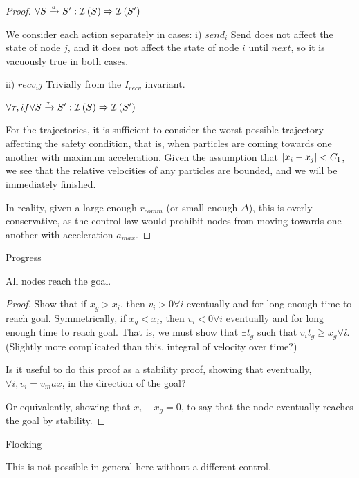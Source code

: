\documentclass[10pt, conference, compsocconf]{IEEEtran}
\begin{document}
\begin{proof}
$\forall S \xrightarrow{a} S^{\prime} : {\cal I}\left(S\right) \Rightarrow {\cal I}\left(S^{\prime}\right)$

We consider each action separately in cases:
i) $send_i$
Send does not affect the state of node $j$, and it does not affect the state of node $i$ until $next$, so it is vacuously true in both cases.

ii) $recv_ij$
Trivially from the $I_{recv}$ invariant.

$\forall \tau, if \forall S \xrightarrow{\tau} S^{\prime} : {\cal I}\left(S\right) \Rightarrow {\cal I}\left(S^{\prime}\right)$

For the trajectories, it is sufficient to consider the worst possible trajectory affecting the safety condition, that is, when particles are coming towards one another with maximum acceleration.  Given the assumption that $\lvert x_i - x_j\rvert < C_1$, we see that the relative velocities of any particles are bounded, and we will be immediately finished.

In reality, given a large enough $r_{comm}$ (or small enough $\Delta$), this is overly conservative, as the control law would prohibit nodes from moving towards one another with acceleration $a_{max}$.
\end{proof}

\begin{inv}Progress

All nodes reach the goal.
\end{inv}

\begin{proof}
Show that if $x_g > x_i$, then $v_i > 0 \forall i$ eventually and for long enough time to reach goal.  Symmetrically, if $x_g < x_i$, then $v_i < 0 \forall i$ eventually and for long enough time to reach goal.  That is, we must show that $\exists t_g$ such that $v_i t_g \geq x_g \forall i$.  (Slightly more complicated than this, integral of velocity over time?)

Is it useful to do this proof as a stability proof, showing that eventually, $\forall i, v_i = v_max$, in the direction of the goal?

Or equivalently, showing that $x_i - x_g = 0$, to say that the node eventually reaches the goal by stability.
\end{proof}

\begin{inv}Flocking

This is not possible in general here without a different control.
\end{inv}
\end{document}
